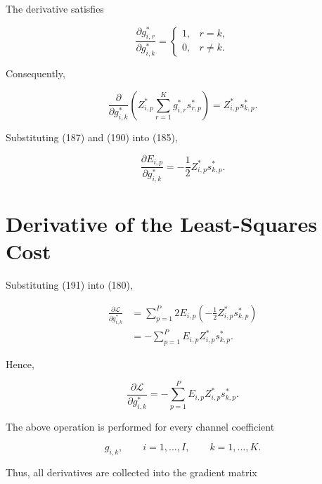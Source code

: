 \documentclass[12pt,a4paper]{article}
\begin{document}
The derivative satisfies

\begin{equation}
\frac{\partial g_{i,r}^{*}}
{\partial g_{i,k}^{*}}
=
\begin{cases}
1, & r=k,\\
0, & r\neq k.
\end{cases}
\tag{189}
\end{equation}

Consequently,

\begin{equation}
\frac{\partial}
{\partial g_{i,k}^{*}}
\left(
Z_{i,p}^{*}
\sum_{r=1}^{K}
g_{i,r}^{*}s_{r,p}^{*}
\right)
=
Z_{i,p}^{*}s_{k,p}^{*}.
\tag{190}
\end{equation}

Substituting (187) and (190) into (185),

\begin{equation}
\boxed{
\frac{\partial E_{i,p}}
{\partial g_{i,k}^{*}}
=
-\frac{1}{2}
Z_{i,p}^{*}s_{k,p}^{*}
}.
\tag{191}
\end{equation}

\section{Derivative of the Least-Squares Cost}

Substituting (191) into (180),

\begin{align}
\frac{\partial\mathcal{L}}
{\partial g_{i,k}^{*}}
&=
\sum_{p=1}^{P}
2E_{i,p}
\left(
-\frac{1}{2}
Z_{i,p}^{*}s_{k,p}^{*}
\right)
\nonumber\\
&=
-\sum_{p=1}^{P}
E_{i,p}
Z_{i,p}^{*}
s_{k,p}^{*}.
\tag{192}
\end{align}

Hence,

\begin{equation}
\boxed{
\frac{\partial\mathcal{L}}
{\partial g_{i,k}^{*}}
=
-\sum_{p=1}^{P}
E_{i,p}
Z_{i,p}^{*}
s_{k,p}^{*}
}.
\tag{193}
\end{equation}

The above operation is performed for every channel coefficient

\begin{equation}
g_{i,k},
\qquad
i=1,\ldots,I,
\qquad
k=1,\ldots,K.
\tag{194}
\end{equation}

Thus, all derivatives are collected into the gradient matrix
\end{document}
